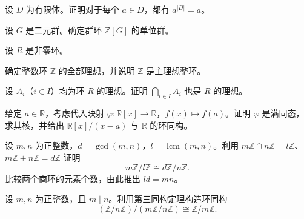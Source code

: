 \noindent\begin{minipage}{\textwidth}
设 $D$ 为有限体。证明对于每个 $a\in D$，都有 $a^{|D|}=a$。
\end{minipage}\par\vfill
\noindent\begin{minipage}{\textwidth}
设 $G$ 是二元群。确定群环 $\mathbb{Z}[G]$ 的单位群。
\end{minipage}\par\vfill
\newpage
\noindent\begin{minipage}{\textwidth}
设 $R$ 是非零环。
\end{minipage}\par\vfill
\noindent\begin{minipage}{\textwidth}
确定整数环 $\mathbb{Z}$ 的全部理想，并说明 $\mathbb{Z}$ 是主理想整环。
\end{minipage}\par\vfill
\noindent\begin{minipage}{\textwidth}
设 $A_i$（$i\in I$）均为环 $R$ 的理想。证明 $\bigcap_{i\in I}A_i$ 也是 $R$ 的理想。
\end{minipage}\par\vfill
\newpage
\noindent\begin{minipage}{\textwidth}
给定 $a\in\mathbb{R}$，考虑代入映射 $\varphi\colon\mathbb{R}[x]\to\mathbb{R}$，$f(x)\mapsto f(a)$。证明 $\varphi$ 是满同态，求其核，并给出 $\mathbb{R}[x]/(x-a)$ 与 $\mathbb{R}$ 的环同构。
\end{minipage}\par\vfill
\noindent\begin{minipage}{\textwidth}
设 $m,n$ 为正整数，$d=\gcd(m,n)$，$l=\operatorname{lcm}(m,n)$。利用 $m\mathbb{Z}\cap n\mathbb{Z}=l\mathbb{Z}$、$m\mathbb{Z}+n\mathbb{Z}=d\mathbb{Z}$ 证明
\[
m\mathbb{Z}/l\mathbb{Z}\cong d\mathbb{Z}/n\mathbb{Z}.
\]
比较两个商环的元素个数，由此推出 $ld=mn$。
\end{minipage}\par\vfill
\noindent\begin{minipage}{\textwidth}
设 $m,n$ 为正整数，且 $m\mid n$。利用第三同构定理构造环同构
\[
(\mathbb{Z}/n\mathbb{Z})/(m\mathbb{Z}/n\mathbb{Z})\cong\mathbb{Z}/m\mathbb{Z}.
\]
\end{minipage}\par\vfill
